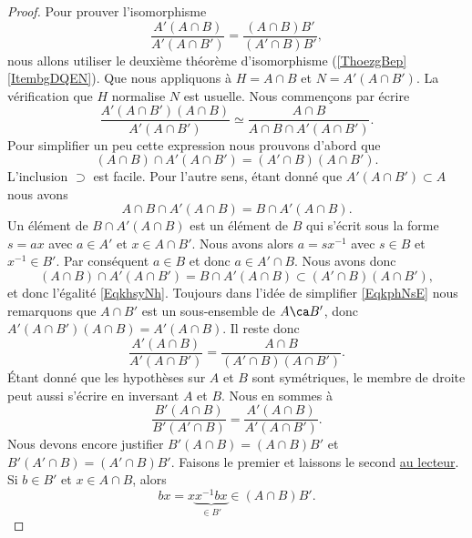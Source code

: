 \begin{proof}
    Pour prouver l'isomorphisme
    \begin{equation}
        \frac{ A'(A\cap B) }{ A'(A\cap B') }=\frac{ (A\cap B)B' }{ (A'\cap B)B' },
    \end{equation}
    nous allons utiliser le deuxième théorème d'isomorphisme (\ref{ThoezgBep}\ref{ItembgDQEN}). Que nous appliquons à \( H=A\cap B\) et \( N=A'(A\cap B')\). La vérification que \( H\) normalise \( N\) est usuelle. Nous commençons par écrire
    \begin{equation}    \label{EqkphNsE}
        \frac{ A'(A\cap B')(A\cap B) }{ A'(A\cap B') }\simeq\frac{ A\cap B }{ A\cap B\cap A'(A\cap B') }.
    \end{equation}
    Pour simplifier un peu cette expression nous prouvons d'abord que
    \begin{equation}    \label{EqkhsyNh}
        (A\cap B)\cap A'(A\cap B')=(A'\cap B)(A\cap B').
    \end{equation}
    L'inclusion \( \supset\) est facile. Pour l'autre sens, étant donné que \( A'(A\cap B')\subset A\) nous avons
    \begin{equation}
        A\cap B\cap A'(A\cap B)=B\cap A'(A\cap B).
    \end{equation}
    Un élément de \( B\cap A'(A\cap B)\) est un élément de \(   B\) qui s'écrit sous la forme \( s=ax\) avec \( a\in A'\) et \( x\in A\cap B'\). Nous avons alors \( a=sx^{-1}\) avec \( s\in B\) et \( x^{-1} \in B'\). Par conséquent \( a\in B\) et donc \( a\in A'\cap B\). Nous avons donc
    \begin{equation}
        (A\cap B)\cap A'(A\cap B')=B\cap A'(A\cap B)\subset (A'\cap B)(A\cap B'),
    \end{equation}
    et donc l'égalité \eqref{EqkhsyNh}. Toujours dans l'idée de simplifier \eqref{EqkphNsE} nous remarquons que \( A\cap B'\) est un sous-ensemble de \( A\ca B'\), donc \( A'(A\cap B')(A\cap B)=A'(A\cap B)\). Il reste donc
    \begin{equation}
        \frac{ A'(A\cap B) }{ A'(A\cap B') }=\frac{ A\cap B }{ (A'\cap B)(A\cap B') }.
    \end{equation}
    Étant donné que les hypothèses sur \( A\) et \( B\) sont symétriques, le membre de droite peut aussi s'écrire en inversant \( A\) et \( B\). Nous en sommes à
    \begin{equation}
        \frac{ B'(A\cap B) }{ B'(A'\cap B) }=\frac{ A'(A\cap B) }{ A'(A\cap B') }.
    \end{equation}
    Nous devons encore justifier \( B'(A\cap B)=(A\cap B)B'\) et \( B'(A'\cap B)=(A'\cap B)B'\). Faisons le premier et laissons le second \href{http://abstrusegoose.com/395}{au lecteur}.
    Si \( b\in B'\) et \( x\in A\cap B\), alors
    \begin{equation}
        bx=x\underbrace{x^{-1}bx}_{\in B'}\in (A\cap B)B'.
    \end{equation}
\end{proof}

